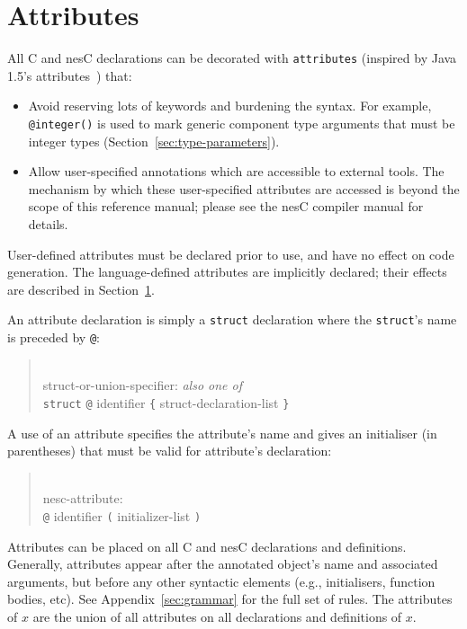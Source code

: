 \documentclass[11pt,letterpaper]{article}
\newcommand{\kw}[1]{{\tt #1}}
\newcommand{\code}[1]{{\tt #1}}
\newcommand{\nesc}{nesC\xspace}
\newcommand{\grammarshift}{\vspace*{-.7cm}}
\newcommand{\grammarindent}{\hspace*{2cm}\= \\ \kill}
\begin{document}
\section{Attributes}
\label{sec:attributes}

All C and \nesc declarations can be decorated with \kw{attributes}
(inspired by Java 1.5's attributes~\cite{java-attributes}) that:
\begin{itemize}
\item Avoid reserving lots of keywords and burdening the syntax. For
 example, \code{@integer()} is used to mark generic component type arguments
 that must be integer types (Section~\ref{sec:type-parameters}).

\item Allow user-specified annotations which are accessible to external tools.
The mechanism by which these user-specified attributes are accessed is
beyond the scope of this reference manual; please see the \nesc compiler
manual for details.
\end{itemize}

User-defined attributes must be declared prior to use, and have no effect
on code generation. The language-defined attributes are implicitly
declared; their effects are described in Section~\ref{sec:attributes}.

An attribute declaration is simply a \kw{struct} declaration where the
\kw{struct}'s name is preceded by \code{@}:
\begin{quote} \grammarshift
\em \begin{tabbing}
\grammarindent
struct-or-union-specifier: \emph{also one of}\\
\>	\kw{struct} \kw{@} identifier \kw{\{} struct-declaration-list \kw{\}}\\
\end{tabbing}
\end{quote}

A use of an attribute specifies the attribute's name and gives an initialiser
(in parentheses) that must be valid for attribute's declaration:
\begin{quote} \grammarshift
\em \begin{tabbing}
\grammarindent
nesc-attribute:\\
\>	\kw{@} identifier \kw{(} initializer-list \kw{)}\\
\end{tabbing}
\end{quote}


Attributes can be placed on all C and \nesc declarations and definitions.
Generally, attributes appear after the annotated object's name and
associated arguments, but before any other syntactic elements (e.g.,
initialisers, function bodies, etc). See Appendix~\ref{sec:grammar} for the
full set of rules. The attributes of $x$ are the union of all attributes on
all declarations and definitions of $x$.
\end{document}
